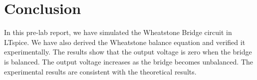
\chapter{Conclusion}

In this pre-lab report, we have simulated the Wheatstone Bridge circuit in LTspice. We have also derived the Wheatstone balance equation and verified it experimentally. The results show that the output voltage is zero when the bridge is balanced. The output voltage increases as the bridge becomes unbalanced. The experimental results are consistent with the theoretical results.
